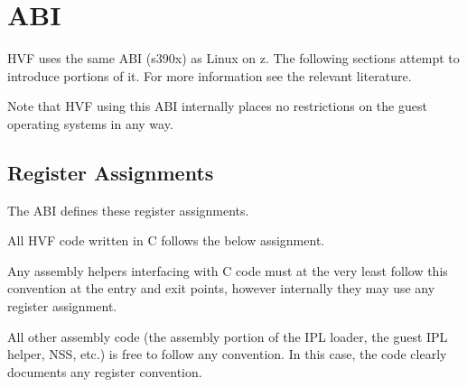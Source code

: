 \chapter{ABI}
\label{chap:abi}
HVF uses the same ABI (s390x) as Linux on z.  The following sections attempt
to introduce portions of it.  For more information see the relevant
literature.

Note that HVF using this ABI internally places no restrictions on the guest
operating systems in any way.

\section{Register Assignments}
The ABI defines these register assignments.

\cbstart
All HVF code written in C follows the below assignment.

Any assembly helpers interfacing with C code must at the very least follow
this convention at the entry and exit points, however internally they may
use any register assignment.

All other assembly code (the assembly portion of the IPL loader, the guest
IPL helper, NSS, etc.) is free to follow any convention.  In this case, the
code clearly documents any register convention.
\cbend

